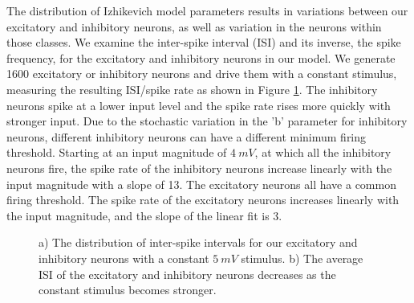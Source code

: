 The distribution of Izhikevich model parameters results in variations between our excitatory and inhibitory neurons, as well as variation in the neurons within those classes.
We examine the inter-spike interval (ISI) and its inverse, the spike frequency, for the excitatory and inhibitory neurons in our model.
We generate 1600 excitatory or inhibitory neurons and drive them with a constant stimulus, measuring the resulting ISI/spike rate as shown in Figure \ref{fig:ISI_statistics}.
The inhibitory neurons spike at a lower input level and the spike rate rises more quickly with stronger input.
Due to the stochastic variation in the 'b' parameter for inhibitory neurons, different inhibitory neurons can have a different minimum firing threshold.
Starting at an input magnitude of $4\ mV$, at which all the inhibitory neurons fire, the spike rate of the inhibitory neurons increase linearly with the input magnitude with a slope of 13.
The excitatory neurons all have a common firing threshold.
The spike rate of the excitatory neurons increases linearly with the input magnitude, and the slope of the linear fit is 3.
\begin{figure}[!htb]
 \centering
 \label{fig:ISI_statistics}
  \caption{a) The distribution of inter-spike intervals for our excitatory and inhibitory neurons with a constant $5\ mV$ stimulus.  
          b) The average ISI of the excitatory and inhibitory neurons decreases as the constant stimulus becomes stronger.} 
\end{figure}
 \FloatBarrier


